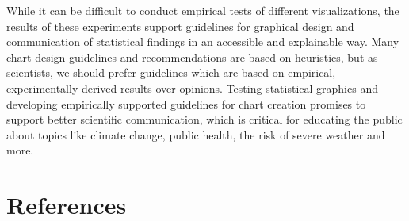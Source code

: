 \documentclass[
  10pt,
  letterpaper,
  DIV=11,
  numbers=noendperiod]{scrartcl}
\begin{document}
While it can be difficult to conduct empirical tests of different
visualizations, the results of these experiments support guidelines for
graphical design and communication of statistical findings in an
accessible and explainable way. Many chart design guidelines and
recommendations are based on heuristics, but as scientists, we should
prefer guidelines which are based on empirical, experimentally derived
results over opinions. Testing statistical graphics and developing
empirically supported guidelines for chart creation promises to support
better scientific communication, which is critical for educating the
public about topics like climate change, public health, the risk of
severe weather and more.

\section{References}\label{references}
\end{document}
